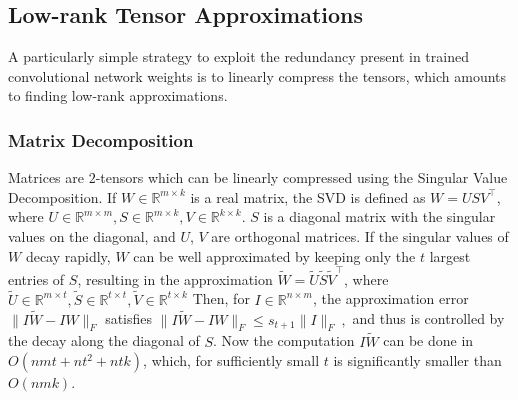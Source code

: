 \subsection{Low-rank Tensor Approximations}\label{subsec:low_rank}

A particularly simple strategy to exploit the redundancy present in trained convolutional network weights is to 
linearly compress the tensors, which amounts to finding low-rank approximations. 

\subsubsection{Matrix Decomposition}\label{subsubsec:svd}
Matrices are $2$-tensors which can be linearly compressed using the Singular Value Decomposition. 
If $W \in \mathbb{R}^{m \times k}$ is a real matrix, the SVD is defined as
	$W = USV^{\top}$, where $U \in \mathbb{R}^{m \times m}, S \in \mathbb{R}^{m \times k}, V \in \mathbb{R}^{k \times k}$.
$S$ is a diagonal matrix with the singular values on the diagonal, and $U$, $V$ are orthogonal matrices. 
If the singular values of $W$ decay rapidly, $W$ can be well approximated by keeping only the $t$ largest entries of $S$, 
resulting in the approximation 
	$\tilde{W} = \tilde{U}\tilde{S}\tilde{V}^{\top}$, where $\tilde{U} \in \mathbb{R}^{m \times t}, \tilde{S} \in \mathbb{R}^{t \times t}, \tilde{V} \in \mathbb{R}^{t \times k}$
Then, for $I \in \mathbb{R}^{n \times m}$, the approximation error $\| I \tilde{W} - I W \|_F$ satisfies 
  $\| I \tilde{W} - I W \|_F \leq s_{t+1} \| I \|_F~,$
and thus is controlled by the decay along the diagonal of $S$.
Now the computation $I\tilde{W}$ can be done in $O(nmt + nt^2 + ntk)$, which, for sufficiently small $t$ is significantly smaller than $O(nmk)$. 

